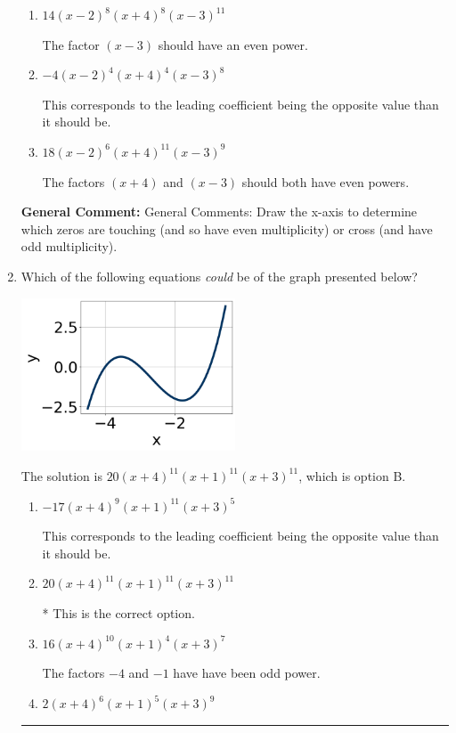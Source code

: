 \documentclass{extbook}[14pt]
\newcommand{\litem}[1]{\item #1

\rule{\textwidth}{0.4pt}}
\begin{document}
\begin{enumerate}
{\begin{enumerate}[label=\Alph*.]
The factor $(x - 3)$ should have an even power and the leading coefficient should be the opposite sign.
\item \( 14(x - 2)^{8} (x + 4)^{8} (x - 3)^{11} \)

The factor $(x - 3)$ should have an even power.
\item \( -4(x - 2)^{4} (x + 4)^{4} (x - 3)^{8} \)

This corresponds to the leading coefficient being the opposite value than it should be.
\item \( 18(x - 2)^{6} (x + 4)^{11} (x - 3)^{9} \)

The factors $(x + 4)$ and $(x - 3)$ should both have even powers.
\end{enumerate}

\textbf{General Comment:} General Comments: Draw the x-axis to determine which zeros are touching (and so have even multiplicity) or cross (and have odd multiplicity).
}
\litem{
Which of the following equations \textit{could} be of the graph presented below?

\begin{center}
    \includegraphics[width=0.5\textwidth]{../Figures/polyGraphToFunctionB.png}
\end{center}



The solution is \( 20(x + 4)^{11} (x + 1)^{11} (x + 3)^{11} \), which is option B.\begin{enumerate}[label=\Alph*.]
\item \( -17(x + 4)^{9} (x + 1)^{11} (x + 3)^{5} \)

This corresponds to the leading coefficient being the opposite value than it should be.
\item \( 20(x + 4)^{11} (x + 1)^{11} (x + 3)^{11} \)

* This is the correct option.
\item \( 16(x + 4)^{10} (x + 1)^{4} (x + 3)^{7} \)

The factors $-4$ and $-1$ have have been odd power.
\item \( 2(x + 4)^{6} (x + 1)^{5} (x + 3)^{9} \)


\end{enumerate}}
\end{enumerate}
\end{document}
